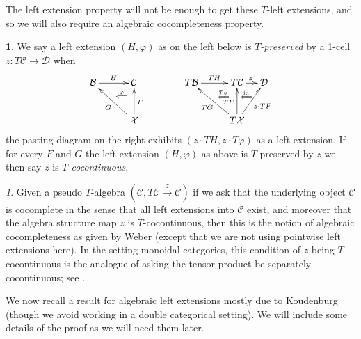 \documentclass[a4paper,oneside,english]{amsart}
\numberwithin{equation}{section}
\numberwithin{figure}{section}
\theoremstyle{plain}
\theoremstyle{definition}
\newtheorem{defn}[thm]{\protect\definitionname}
\theoremstyle{remark}
\newtheorem{rem}[thm]{\protect\remarkname}
\theoremstyle{definition}
\theoremstyle{plain}
\theoremstyle{plain}
\theoremstyle{plain}
\providecommand{\definitionname}{Definition}
\providecommand{\remarkname}{Remark}
\begin{document}
The left extension property will not be enough to get these $T$-left
extensions, and so we will also require an algebraic cocompleteness
property.
\begin{defn}
\label{Tpreserved} We say a left extension $\left(H,\varphi\right)$
as on the left below is \emph{$T$-preserved} by a 1-cell $z:T\mathcal{C}\to\mathcal{D}$
when 
\[
\xymatrix@=1em{\mathcal{B}\ar[rr]^{H} &  & \mathcal{C}\ar@{}[ld]|-{\stackrel{\varphi}{\Longleftarrow}} &  &  & T\mathcal{B}\ar[rr]^{TH} &  & T\mathcal{C}\ar@{}[ld]|-{\stackrel{T\varphi}{\Longleftarrow}}\ar[r]^{z} & \mathcal{D}\\
 & \; &  &  &  &  &  &  & \;\ar@{}[ul]|-{\stackrel{\textnormal{id}}{\Longleftarrow}\quad\;\;}\\
 &  & \mathcal{X}\ar[uu]_{F}\ar[uull]^{G} &  &  &  &  & T\mathcal{X}\ar[uu]^{TF}\ar[uull]^{TG}\ar[uur]_{z\cdot TF}
}
\]
the pasting diagram on the right exhibits $\left(z\cdot TH,z\cdot T\varphi\right)$
as a left extension. If for every $F$ and $G$ the left extension
$\left(H,\varphi\right)$ as above is $T$-preserved by $z$ we then
say $z$ is \emph{$T$-cocontinuous}.\end{defn}
\begin{rem}
Given a pseudo $T$-algebra $\left(\mathcal{C},T\mathcal{C}\overset{z}{\rightarrow}\mathcal{C}\right)$
if we ask that the underlying object $\mathcal{C}$ is cocomplete
in the sense that all left extensions into $\mathcal{C}$ exist, and
moreover that the algebra structure map $z$ is $T$-cocontinuous,
then this is the notion of algebraic cocompleteness as given by Weber
\cite[Definition 2.3.1]{markextension} (except that we are not using
pointwise left extensions here). In the setting monoidal categories,
this condition of $z$ being $T$-cocontinuous is the analogue of
asking the tensor product be separately cocontinuous; see \cite[Prop. 2.3.2]{markextension}.
\end{rem}
We now recall a result for algebraic left extensions mostly due to
Koudenburg \cite{roald2015} (though we avoid working in a double
categorical setting). We will include some details of the proof as
we will need them later.
\end{document}
